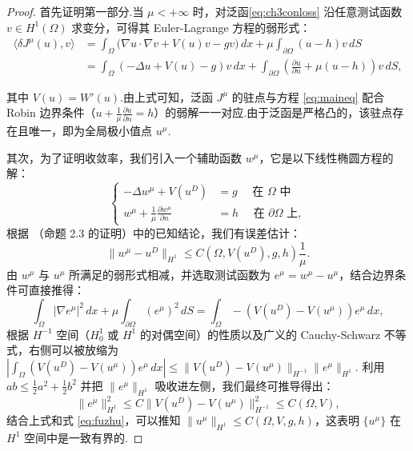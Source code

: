 \begin{proof}
首先证明第一部分.当 $\mu<+\infty$ 时，对泛函\eqref{eq:ch3conloss} 沿任意测试函数 $v \in H^1(\Omega)$ 求变分，可得其 Euler-Lagrange 方程的弱形式：
\begin{equation*}
\begin{aligned}
\langle \delta J^{\mu}(u), v \rangle &= \int_{\Omega} \big( \nabla u \cdot \nabla v + V(u) v - gv \big) \,dx + \mu\int_{\partial \Omega}(u-h)v \,dS \\
&= \int_{\Omega} \left(-\Delta u+V(u)-g\right)v \,dx + \int_{\partial \Omega} \left(\frac{\partial u}{\partial n} + \mu(u-h)\right) v \,dS,
\end{aligned}
\end{equation*}

其中 $V(u) = W'(u)$.由上式可知，泛函 $J^{\mu}$ 的驻点与方程 \eqref{eq:maineq} 配合 Robin 边界条件（$u+\frac{1}{\mu}\frac{\partial u}{\partial n}=h$）的弱解一一对应.由于泛函是严格凸的，该驻点存在且唯一，即为全局极小值点 $u^{\mu}$.

其次，为了证明收敛率，我们引入一个辅助函数 $w^{\mu}$，它是以下线性椭圆方程的解：
\begin{equation*}
\left\{\begin{aligned}
-\Delta w^{\mu} +V(u^{D})&=g \quad \text { 在 } \Omega \text{ 中} \\
 w^{\mu}+\frac{1}{\mu}\frac{\partial w^{\mu}}{\partial n} &=h \quad \text { 在 } \partial \Omega \text{ 上},
\end{aligned}\right.
\end{equation*}
根据 \cite{Maury2009Numerical}（命题 2.3 的证明）中的已知结论，我们有误差估计：
\begin{equation}\label{eq:fuzhu}
\|w^{\mu}-u^{D}\|_{H^{1}}\leq C(\Omega,V(u^{D}),g,h)\frac{1}{\mu}.
\end{equation}
由 $w^{\mu}$ 与 $u^{\mu}$ 所满足的弱形式相减，并选取测试函数为 $e^{\mu}=w^{\mu} - u^{\mu}$，结合边界条件可直接推得：
$$\int_{\Omega} |\nabla e^{\mu}|^2 \,dx + \mu \int_{\partial \Omega} (e^{\mu})^2 \,dS = \int_{\Omega} -\left( V(u^{D}) - V(u^{\mu}) \right) e^{\mu} \,dx,$$
根据 $H^{-1}$ 空间（$H^1_0$ 或 $H^1$ 的对偶空间）的性质以及广义的 Cauchy-Schwarz 不等式，右侧可以被放缩为 $\left| \int_{\Omega} \left( V(u^{D}) - V(u^{\mu}) \right) e^{\mu} \,dx \right| \leq \|V(u^{D}) - V(u^{\mu})\|_{H^{-1}} \|e^{\mu}\|_{H^{1}}$.
利用 $ab \leq \frac{1}{2}a^2 + \frac{1}{2}b^2$ 并把 $\|e^{\mu}\|_{H^1}$ 吸收进左侧，我们最终可推导得出：
$$\|e^{\mu}\|_{H^{1}}^2\leq C \|V(u^{D}) - V(u^{\mu})\|^2_{H^{-1}}\leq C(\Omega,V),$$
结合上式和式 \eqref{eq:fuzhu}，可以推知 $\|u^{\mu}\|_{H^{1}}\leq C(\Omega,V,g,h)$，这表明 $\{u^{\mu}\}$ 在 $H^{1}$ 空间中是一致有界的.


\end{proof}
